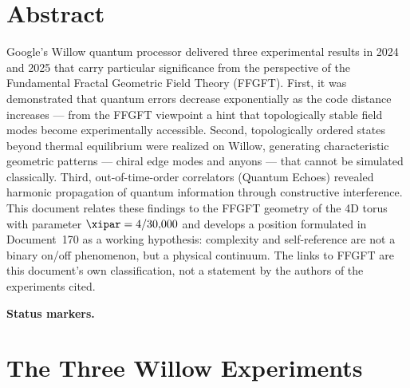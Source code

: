 
\section*{Abstract}

Google's Willow quantum processor delivered three experimental results in 2024
and 2025 that carry particular significance from the perspective of the Fundamental
Fractal Geometric Field Theory (FFGFT). First, it was demonstrated
that quantum errors decrease exponentially as the code distance increases — from the FFGFT viewpoint a hint
that topologically stable field modes become experimentally accessible. Second,
topologically ordered states beyond thermal equilibrium were realized on Willow,
generating characteristic geometric patterns — chiral edge modes and anyons — that
cannot be simulated classically. Third, out-of-time-order correlators (Quantum Echoes)
revealed harmonic propagation of quantum information through constructive interference.
This document relates these findings to the FFGFT geometry of the 4D torus with
parameter $\xipar = 4/30{,}000$ and develops a position formulated in Document~170
as a working hypothesis: complexity and self-reference are not a binary on/off
phenomenon, but a physical continuum.
The links to FFGFT are this document's own classification, not a statement by the
authors of the experiments cited.

\medskip\noindent\textbf{Status markers.}


\clearpage

\section{The Three Willow Experiments}

